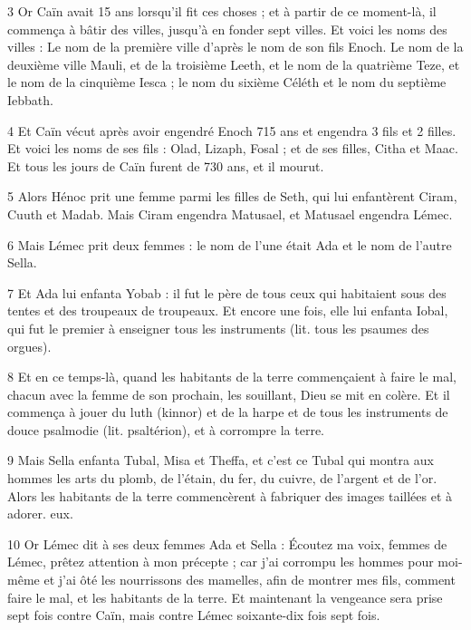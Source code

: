 \par 3 Or Caïn avait 15 ans lorsqu'il fit ces choses ; et à partir de ce moment-là, il commença à bâtir des villes, jusqu'à en fonder sept villes. Et voici les noms des villes : Le nom de la première ville d'après le nom de son fils Enoch. Le nom de la deuxième ville Mauli, et de la troisième Leeth, et le nom de la quatrième Teze, et le nom de la cinquième Iesca ; le nom du sixième Céléth et le nom du septième Iebbath.

\par 4 Et Caïn vécut après avoir engendré Enoch 715 ans et engendra 3 fils et 2 filles. Et voici les noms de ses fils : Olad, Lizaph, Fosal ; et de ses filles, Citha et Maac. Et tous les jours de Caïn furent de 730 ans, et il mourut.

\par 5 Alors Hénoc prit une femme parmi les filles de Seth, qui lui enfantèrent Ciram, Cuuth et Madab. Mais Ciram engendra Matusael, et Matusael engendra Lémec.

\par 6 Mais Lémec prit deux femmes : le nom de l'une était Ada et le nom de l'autre Sella.

\par 7 Et Ada lui enfanta Yobab : il fut le père de tous ceux qui habitaient sous des tentes et des troupeaux de troupeaux. Et encore une fois, elle lui enfanta Iobal, qui fut le premier à enseigner tous les instruments (lit. tous les psaumes des orgues).

\par 8 Et en ce temps-là, quand les habitants de la terre commençaient à faire le mal, chacun avec la femme de son prochain, les souillant, Dieu se mit en colère. Et il commença à jouer du luth (kinnor) et de la harpe et de tous les instruments de douce psalmodie (lit. psaltérion), et à corrompre la terre.

\par 9 Mais Sella enfanta Tubal, Misa et Theffa, et c'est ce Tubal qui montra aux hommes les arts du plomb, de l'étain, du fer, du cuivre, de l'argent et de l'or. Alors les habitants de la terre commencèrent à fabriquer des images taillées et à adorer. eux.

\par 10 Or Lémec dit à ses deux femmes Ada et Sella : Écoutez ma voix, femmes de Lémec, prêtez attention à mon précepte ; car j'ai corrompu les hommes pour moi-même et j'ai ôté les nourrissons des mamelles, afin de montrer mes fils, comment faire le mal, et les habitants de la terre. Et maintenant la vengeance sera prise sept fois contre Caïn, mais contre Lémec soixante-dix fois sept fois.

